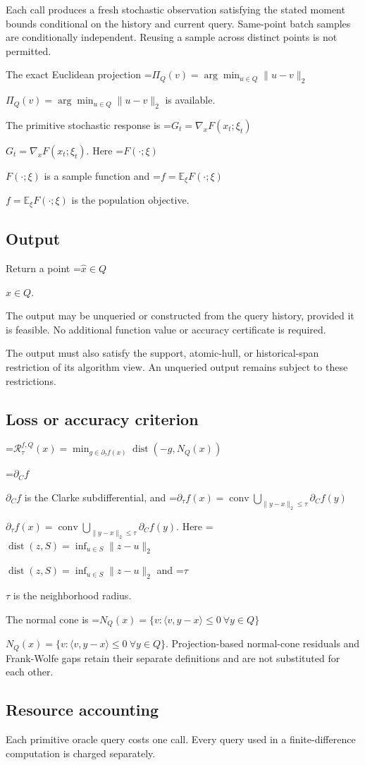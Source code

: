 \documentclass[10pt,a4paper]{article}
\newcommand{\AtlasMath}[1]{\par\begingroup\centering\setbox0=\hbox{$\displaystyle #1$}\ifdim\wd0>1.4\linewidth\typeout{ATLAS WIDE FORMULA: \the\wd0}\fi\ifdim\wd0>\linewidth\resizebox{\linewidth}{!}{\box0}\else\box0\fi\par\endgroup}
\newcommand{\AtlasInlineMath}[1]{\begingroup\setbox0=\hbox{$#1$}\ifdim\wd0>.4\linewidth\endgroup\AtlasMath{#1}\else\endgroup$#1$\fi}
\begin{document}
Each call produces a fresh stochastic observation satisfying the stated moment bounds conditional on the history and current query. Same-point batch samples are conditionally independent. Reusing a sample across distinct points is not permitted.

The exact Euclidean projection \AtlasInlineMath{\Pi_Q(v)=\arg\min_{u\in Q}\|u-v\|_2} is available.

The primitive stochastic response is \AtlasInlineMath{G_t=\nabla_x F(x_t;\xi_t)}. Here \AtlasInlineMath{F(\cdot;\xi)} is a sample function and \AtlasInlineMath{f=\mathbb E_\xi F(\cdot;\xi)} is the population objective.

\subsection{Output}
Return a point \AtlasInlineMath{\widehat x\in Q}.

The output may be unqueried or constructed from the query history, provided it is feasible. No additional function value or accuracy certificate is required.

The output must also satisfy the support, atomic-hull, or historical-span restriction of its algorithm view. An unqueried output remains subject to these restrictions.

\subsection{Loss or accuracy criterion}

\AtlasMath{\mathcal{R}_\tau^{f,Q}(x)=\min_{g\in\partial_\tau f(x)}\operatorname{dist}(-g,N_Q(x))}


\AtlasInlineMath{\partial_C f} is the Clarke subdifferential, and \AtlasInlineMath{\partial_\tau f(x)=\operatorname{conv}\bigcup_{\|y-x\|_2\le\tau}\partial_C f(y)}. Here \AtlasInlineMath{\operatorname{dist}(z,S)=\inf_{u\in S}\|z-u\|_2} and \AtlasInlineMath{\tau} is the neighborhood radius.

The normal cone is \AtlasInlineMath{N_Q(x)=\{v:\langle v,y-x\rangle\le0\ \forall y\in Q\}}. Projection-based normal-cone residuals and Frank-Wolfe gaps retain their separate definitions and are not substituted for each other.

\subsection{Resource accounting}
Each primitive oracle query costs one call. Every query used in a finite-difference computation is charged separately.
\end{document}
